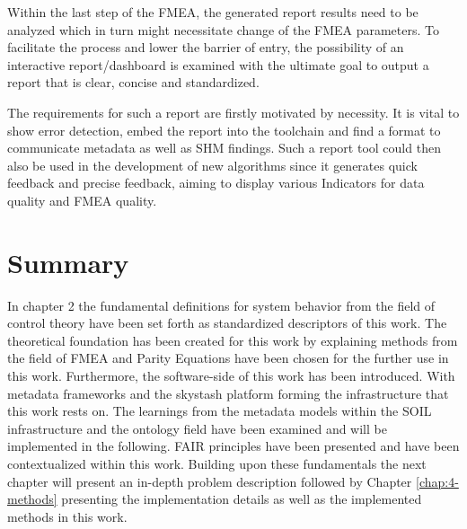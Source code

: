 Within the last step of the FMEA, the generated report results need to be analyzed which in turn might necessitate change of the FMEA parameters. To facilitate the process and lower the barrier of entry, the possibility of an interactive report/dashboard is examined with the ultimate goal to output a report that is clear, concise and standardized.


The requirements for such a report are firstly motivated by necessity. It is vital to show error detection, embed the report into the toolchain and find a format to communicate metadata as well as SHM findings. Such a report tool could then also be used in the development of new algorithms since it generates quick feedback and precise feedback, aiming to display various Indicators for data quality and FMEA quality.


\section{Summary}
In chapter 2 the fundamental definitions for system behavior from the field of control theory have been set forth as standardized descriptors of this work. The theoretical foundation has been created for this work by explaining methods from the field of FMEA and Parity Equations have been chosen for the further use in this work. Furthermore, the software-side of this work has been introduced. With metadata frameworks and the skystash platform forming the infrastructure that this work rests on. The learnings from the metadata models within the SOIL infrastructure and the ontology field have been examined and will be implemented in the following. FAIR principles have been presented and have been contextualized within this work. Building upon these fundamentals the next chapter will present an in-depth problem description followed by Chapter \ref{chap:4-methods} presenting the implementation details as well as the implemented methods in this work.



